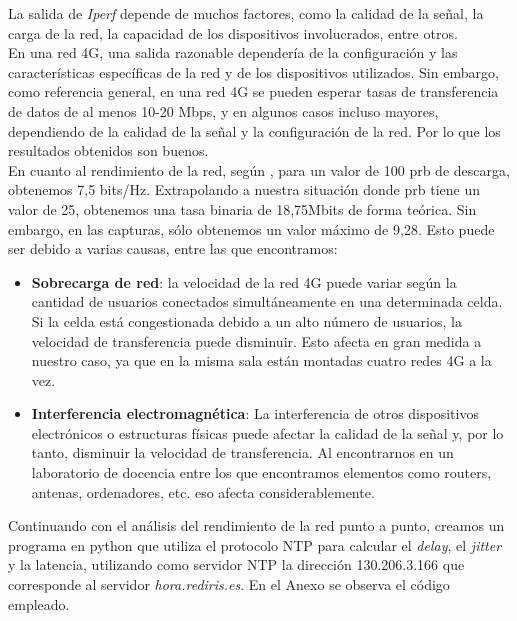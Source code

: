 La salida de \textit{Iperf} depende de muchos factores, como la calidad de la señal, la carga de la red, la capacidad de los dispositivos involucrados, entre otros.\\

En una red 4G, una salida razonable dependería de la configuración y las características específicas de la red y de los dispositivos utilizados. Sin embargo, como referencia general, en una red 4G se pueden esperar tasas de transferencia de datos de al menos 10-20 Mbps, y en algunos casos incluso mayores, dependiendo de la calidad de la señal y la configuración de la red. Por lo que los resultados obtenidos son buenos. \\

En cuanto al rendimiento de la red, según \cite{Rendimiento}, para un valor de 100 prb de descarga, obtenemos 7,5 bits/Hz. Extrapolando a nuestra situación donde prb tiene un valor de 25, obtenemos una tasa binaria de 18,75Mbits de forma teórica. Sin embargo, en las capturas, sólo obtenemos un valor máximo de 9,28. Esto puede ser debido a varias causas, entre las que encontramos: 
\begin{itemize}
\item \textbf{Sobrecarga de red}: la velocidad de la red 4G puede variar según la cantidad de usuarios conectados simultáneamente en una determinada celda. Si la celda está congestionada debido a un alto número de usuarios, la velocidad de transferencia puede disminuir. Esto afecta en gran medida a  nuestro caso, ya que en la misma sala están montadas cuatro redes 4G a la vez. 

\item \textbf{Interferencia electromagnética}: La interferencia de otros dispositivos electrónicos o estructuras físicas puede afectar la calidad de la señal y, por lo tanto, disminuir la velocidad de transferencia. Al encontrarnos en un laboratorio de docencia entre los que encontramos elementos como routers, antenas, ordenadores, etc. eso afecta considerablemente.
\end{itemize}

Continuando con el análisis del rendimiento de la red punto a punto, creamos un programa en python que utiliza el protocolo NTP para calcular el \textit{delay}, el \textit{jitter} y la latencia, utilizando como servidor NTP la dirección 130.206.3.166 que corresponde al servidor \textit{hora.rediris.es}. En el Anexo se observa el código empleado.\\

